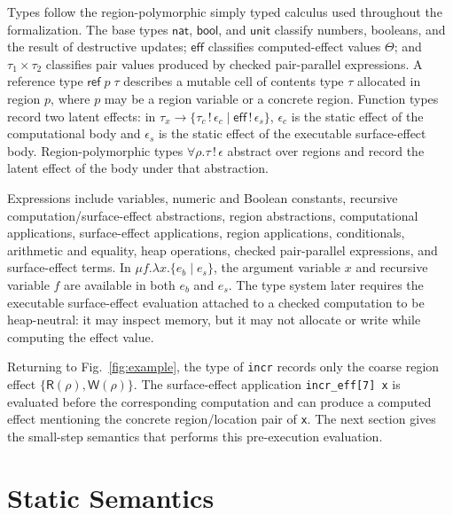 \documentclass[10pt,a4paper]{article}
\newcommand{\Rs}{\mathsf{R}}
\newcommand{\Ws}{\mathsf{W}}
\begin{document}
Types follow the region-polymorphic simply typed calculus used throughout the
formalization. The base types $\mathsf{nat}$, $\mathsf{bool}$, and
$\mathsf{unit}$ classify numbers, booleans, and the result of destructive
updates; $\mathsf{eff}$ classifies computed-effect values $\Theta$; and
$\tau_1\times\tau_2$ classifies pair values produced by checked pair-parallel
expressions. A reference type $\mathsf{ref}\;p\;\tau$ describes a mutable cell of
contents type $\tau$ allocated in region $p$, where $p$ may be a region variable
or a concrete region. Function types record two latent effects: in
$\tau_x \to \{\tau_c\,!\,\epsilon_c \mid \mathsf{eff}\,!\,\epsilon_s\}$,
$\epsilon_c$ is the static effect of the computational body and $\epsilon_s$ is
the static effect of the executable surface-effect body. Region-polymorphic types
$\forall \rho.\tau\,!\,\epsilon$ abstract over regions and record the latent
effect of the body under that abstraction.

Expressions include variables, numeric and Boolean constants, recursive
computation/surface-effect abstractions, region abstractions, computational
applications, surface-effect applications, region applications, conditionals,
arithmetic and equality, heap operations, checked pair-parallel expressions, and
surface-effect terms. In
$\mu f.\lambda x.\{e_b\mid e_s\}$, the argument
variable $x$ and recursive variable $f$ are available in both $e_b$ and $e_s$.
The type system later requires the executable surface-effect evaluation attached
to a checked computation to be heap-neutral: it may inspect
memory, but it may not allocate or write while computing the effect value.

Returning to Fig.~\ref{fig:example}, the type of \lstinline|incr| records only
the coarse region effect $\{\Rs(\rho),\Ws(\rho)\}$. The surface-effect
application \lstinline|incr_eff[7] x| is evaluated before the corresponding
computation and can produce a computed effect mentioning the concrete
region/location pair of \lstinline|x|. The next section gives the small-step
semantics that performs this pre-execution evaluation.






\section{Static Semantics}
\label{sec:staticsem}
\end{document}
